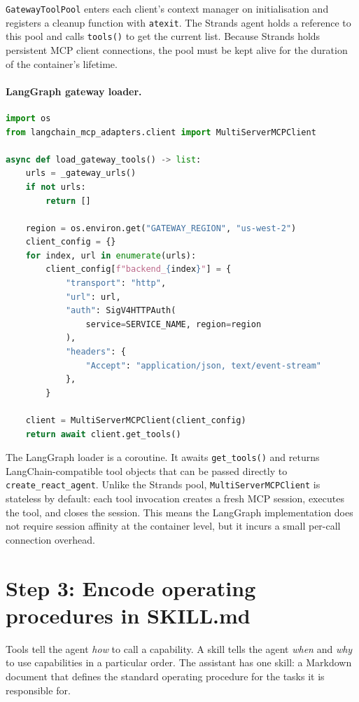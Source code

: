 \texttt{GatewayToolPool} enters each client's context manager on initialisation and
registers a cleanup function with \texttt{atexit}. The Strands agent holds a reference
to this pool and calls \texttt{tools()} to get the current list. Because Strands holds
persistent MCP client connections, the pool must be kept alive for the duration of the
container's lifetime.

\paragraph{LangGraph gateway loader.}

\begin{lstlisting}[language=Python]
import os
from langchain_mcp_adapters.client import MultiServerMCPClient

async def load_gateway_tools() -> list:
    urls = _gateway_urls()
    if not urls:
        return []

    region = os.environ.get("GATEWAY_REGION", "us-west-2")
    client_config = {}
    for index, url in enumerate(urls):
        client_config[f"backend_{index}"] = {
            "transport": "http",
            "url": url,
            "auth": SigV4HTTPAuth(
                service=SERVICE_NAME, region=region
            ),
            "headers": {
                "Accept": "application/json, text/event-stream"
            },
        }

    client = MultiServerMCPClient(client_config)
    return await client.get_tools()
\end{lstlisting}

The LangGraph loader is a coroutine. It awaits \texttt{get\_tools()} and returns
LangChain-compatible tool objects that can be passed directly to
\texttt{create\_react\_agent}. Unlike the Strands pool,
\texttt{MultiServerMCPClient} is stateless by default: each tool invocation creates a
fresh MCP session, executes the tool, and closes the session. This means the LangGraph
implementation does not require session affinity at the container level, but it incurs a
small per-call connection overhead.

\section{Step 3: Encode operating procedures in SKILL.md}

Tools tell the agent \emph{how} to call a capability. A skill tells the agent \emph{when}
and \emph{why} to use capabilities in a particular order. The assistant has one skill: a
Markdown document that defines the standard operating procedure for the tasks it is
responsible for.


